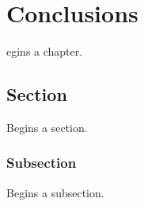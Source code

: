 \let\textcircled=\pgftextcircled
\chapter{Conclusions}
\label{chap:conclusions}

egins a chapter. 

\section{Section}
\label{sec:sec01}

Begins a section.

\subsection{Subsection}
\label{subsec:subsec01}

Begins a subsection.